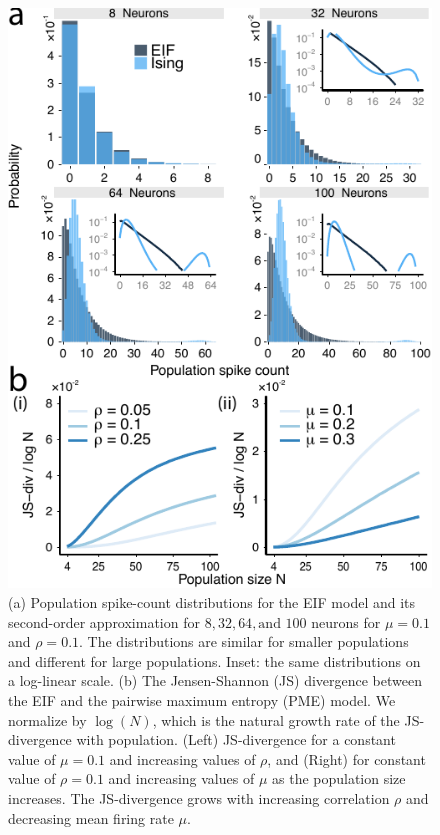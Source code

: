 \documentclass[%
 reprint,
 twocolumn,
 amsmath,amssymb,
 aps,
floatfix,
]{revtex4}
\begin{document}
\begin{figure}[h]
\includegraphics{figures/fig_2a.pdf}
\caption{\label{fig:eifising}(a) Population spike-count distributions for the EIF model and its second-order approximation for $8, 32, 64, \text{and } 100$ neurons for $\mu = 0.1$ and $\rho = 0.1$. The distributions are similar for smaller populations and different for large populations. Inset: the same distributions on a log-linear scale. (b) The Jensen-Shannon (JS) divergence between the EIF and the pairwise maximum entropy (PME) model. We normalize by $\log(N)$, which is the natural growth rate of the JS-divergence with population. (Left) JS-divergence for a constant value of $\mu = 0.1$ and increasing values of $\rho$, and (Right) for constant value of $\rho = 0.1$ and increasing values of $\mu$ as the population size increases. The JS-divergence grows with increasing correlation $\rho$ and decreasing mean firing rate $\mu$.}
\end{figure}
\end{document}
